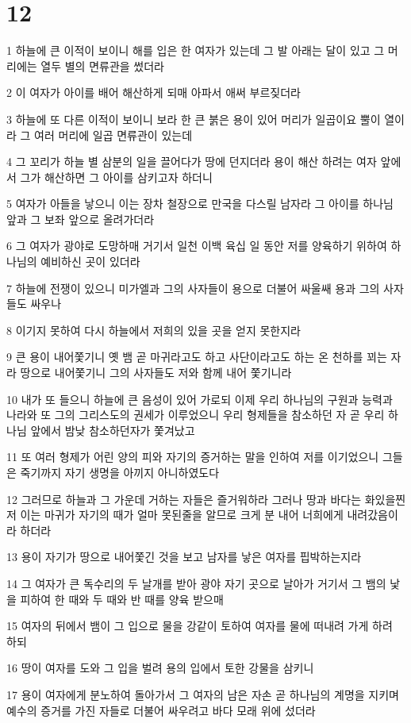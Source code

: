 \chapter{12}

\par 1 하늘에 큰 이적이 보이니 해를 입은 한 여자가 있는데 그 발 아래는 달이 있고 그 머리에는 열두 별의 면류관을 썼더라
\par 2 이 여자가 아이를 배어 해산하게 되매 아파서 애써 부르짖더라
\par 3 하늘에 또 다른 이적이 보이니 보라 한 큰 붉은 용이 있어 머리가 일곱이요 뿔이 열이라 그 여러 머리에 일곱 면류관이 있는데
\par 4 그 꼬리가 하늘 별 삼분의 일을 끌어다가 땅에 던지더라 용이 해산 하려는 여자 앞에서 그가 해산하면 그 아이를 삼키고자 하더니
\par 5 여자가 아들을 낳으니 이는 장차 철장으로 만국을 다스릴 남자라 그 아이를 하나님 앞과 그 보좌 앞으로 올려가더라
\par 6 그 여자가 광야로 도망하매 거기서 일천 이백 육십 일 동안 저를 양육하기 위하여 하나님의 예비하신 곳이 있더라
\par 7 하늘에 전쟁이 있으니 미가엘과 그의 사자들이 용으로 더불어 싸울쌔 용과 그의 사자들도 싸우나
\par 8 이기지 못하여 다시 하늘에서 저희의 있을 곳을 얻지 못한지라
\par 9 큰 용이 내어쫓기니 옛 뱀 곧 마귀라고도 하고 사단이라고도 하는 온 천하를 꾀는 자라 땅으로 내어쫓기니 그의 사자들도 저와 함께 내어 쫓기니라
\par 10 내가 또 들으니 하늘에 큰 음성이 있어 가로되 이제 우리 하나님의 구원과 능력과 나라와 또 그의 그리스도의 권세가 이루었으니 우리 형제들을 참소하던 자 곧 우리 하나님 앞에서 밤낮 참소하던자가 쫓겨났고
\par 11 또 여러 형제가 어린 양의 피와 자기의 증거하는 말을 인하여 저를 이기었으니 그들은 죽기까지 자기 생명을 아끼지 아니하였도다
\par 12 그러므로 하늘과 그 가운데 거하는 자들은 즐거워하라 그러나 땅과 바다는 화있을찐저 이는 마귀가 자기의 때가 얼마 못된줄을 알므로 크게 분 내어 너희에게 내려갔음이라 하더라
\par 13 용이 자기가 땅으로 내어쫓긴 것을 보고 남자를 낳은 여자를 핍박하는지라
\par 14 그 여자가 큰 독수리의 두 날개를 받아 광야 자기 곳으로 날아가 거기서 그 뱀의 낯을 피하여 한 때와 두 때와 반 때를 양육 받으매
\par 15 여자의 뒤에서 뱀이 그 입으로 물을 강같이 토하여 여자를 물에 떠내려 가게 하려 하되
\par 16 땅이 여자를 도와 그 입을 벌려 용의 입에서 토한 강물을 삼키니
\par 17 용이 여자에게 분노하여 돌아가서 그 여자의 남은 자손 곧 하나님의 계명을 지키며 예수의 증거를 가진 자들로 더불어 싸우려고 바다 모래 위에 섰더라

